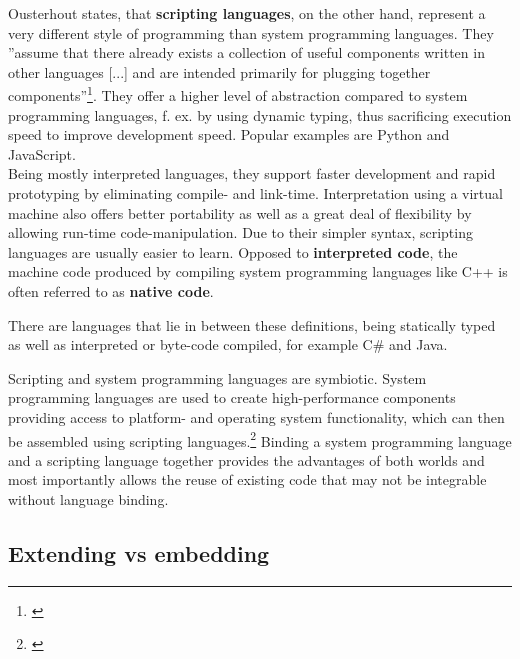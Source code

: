 Ousterhout states, that \textbf{scripting languages}, on the other hand, represent a very different style of programming than system programming languages. They ''assume that there already exists a collection of useful components written in other languages [...] and are intended primarily for plugging together components''\footnote{\citep{Ousterhout}}. They offer a higher level of abstraction compared to system programming languages, f. ex. by using dynamic typing, thus sacrificing execution speed to improve development speed. Popular examples are Python and JavaScript.
\\ Being mostly interpreted languages, they support faster development and rapid prototyping by eliminating compile- and link-time. Interpretation using a virtual machine also offers better portability as well as a great deal of flexibility by allowing run-time code-manipulation. Due to their simpler syntax, scripting languages are usually easier to learn. Opposed to \textbf{interpreted code}, the machine code produced by compiling system programming languages like C++ is often referred to as \textbf{native code}.

There are languages that lie in between these definitions, being statically typed as well as interpreted or byte-code compiled, for example C\# and Java. 

Scripting and system programming languages are symbiotic. System programming languages are used to create high-performance components providing access to platform- and operating system functionality, which can then be assembled using scripting languages.\footnote{\citep{Ousterhout}} Binding a system programming language and a scripting language together provides the advantages of both worlds and most importantly allows the reuse of existing code that may not be integrable without language binding.

\subsection{Extending vs embedding}

